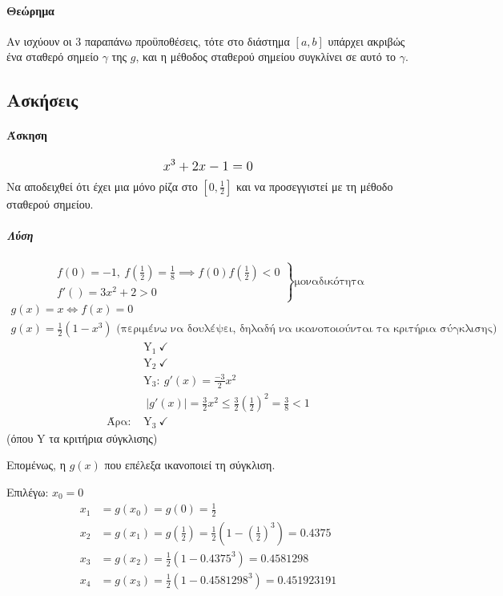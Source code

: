 \documentclass[11pt,a4paper,notitlepage,fleqn,draft]{article}
\begin{document}
	\paragraph{Θεώρημα}
	Αν ισχύουν οι 3 παραπάνω προϋποθέσεις, τότε στο διάστημα
	\( [a,b] \) υπάρχει ακριβώς ένα σταθερό σημείο \(\gamma\)
	της \(g\), και η μέθοδος σταθερού σημείου συγκλίνει σε αυτό
	το \( \gamma \).
	
	\subsection{Ασκήσεις}
	\paragraph{Άσκηση}
	\[
	\mathlarger{x^3+2x-1=0}
	\]
	Να αποδειχθεί ότι έχει μια μόνο ρίζα στο \( \left[0,\frac{1}{2}\right] \) και
	να προσεγγιστεί με τη μέθοδο σταθερού σημείου.
	\subparagraph{Λύση}
	\[ \left.
	\begin{array}{l}
	f(0) = -1,\ f\left(\frac{1}{2}\right) = \frac{1}{8} \implies
	f(0)f\left(\frac{1}{2}\right) < 0 \\
	f'() = 3x^2 + 2 > 0
	\end{array} \right\rbrace \text{μοναδικότητα}
	\]
	\begin{gather*}
	g(x) = x \iff f(x) = 0 \\
	g(x) = \frac{1}{2} (1-x^3) \text{ (περιμένω να δουλέψει, δηλαδή να ικανοποιούνται
		τα κριτήρια σύγκλισης)}
	\end{gather*}
	\begin{align*}
		&\mathrm Y_1 \ \checkmark \\
		&\mathrm Y_2 \ \checkmark \\
		&\mathrm Y_3:\ g'(x) = \frac{-3}{2} x^2 \\
		&\ \left|g'(x)\right| = \frac{3}{2} x^2 \leq \frac{3}{2}\left(\frac{1}{2}\right)^2
		= \frac{3}{8} < 1 \\
		\text{Άρα: } & \mathrm Y_3 \ \checkmark
	\end{align*}
	(όπου \( \mathrm Y \) τα κριτήρια σύγκλισης)
	
	Επομένως, η \( g(x) \) που επέλεξα ικανοποιεί τη σύγκλιση.
	
	Επιλέγω: \( x_0 = 0 \)
	\begin{align*}
		x_1 &= g(x_0) = g(0) = \frac{1}{2} \\
		x_2 &= g(x_1) = g\left(\frac{1}{2}\right) = \frac{1}{2}\left(
		1-\left(\frac{1}{2}\right)^3
		\right) = 0.4375 \\
		x_3 &= g(x_2) = \frac{1}{2} \left(1 - 0.4375^3\right) = 0.4581298 \\
		x_4 &= g(x_3) = \frac{1}{2} \left(1-0.4581298^3\right) = 0.451923191
	\end{align*}
\end{document}

